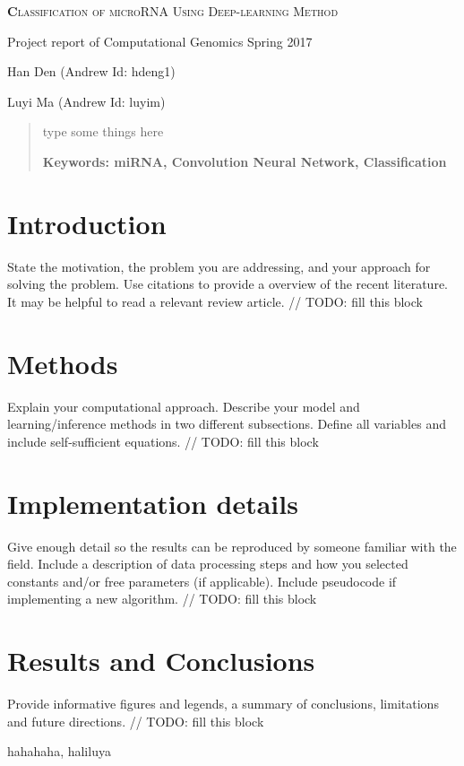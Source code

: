 \documentclass[letterpaper, 11pt]{article}
\begin{document}
\begin{center}
{\Large
	\textsc{\textbf Classification of microRNA Using Deep-learning Method}
}

\vspace{0.3cm}

\normalsize Project report of Computational Genomics Spring 2017

\vspace{0.5cm}

{\small
	Han Den (Andrew Id: hdeng1)
	
	Luyi Ma (Andrew Id: luyim)
}
\end{center}

\begin{abstract}
type some things here

\vspace{2mm}
\bfseries{ Keywords: miRNA, Convolution Neural Network, Classification}
\end{abstract}

\begin{multicols*}{2}
\section{Introduction}
{
State the motivation, the problem you are addressing, and your approach for solving the problem. Use citations to provide a overview of the recent literature. It may be helpful to read a relevant review article.
\newline 
// TODO: fill this block
}
\section{Methods}
{
Explain your computational approach. Describe your model and learning/inference methods in two different subsections. Define all variables and include self-sufficient equations.
\newline 
// TODO: fill this block
}

\section{Implementation details}
{
Give enough detail so the results can be reproduced by someone familiar with the field. Include a description of data processing steps and how you selected constants and/or free parameters (if applicable). Include pseudocode if implementing a new algorithm.
\newline
// TODO: fill this block
}

\section{Results and Conclusions}
{
Provide informative figures and legends, a summary of conclusions, limitations and future directions.
\newline 
// TODO: fill this block
}
\end{multicols*}

\newpage
\begin{multicols*}{2}

\begin{thebibliography}{1}
hahahaha, haliluya
\end{thebibliography}

\end{multicols*}
\end{document}
